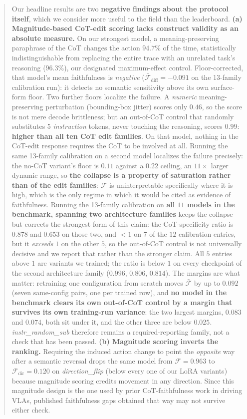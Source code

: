 \documentclass{article}
\begin{document}
\begin{abstract}
Our headline results are two \textbf{negative findings about the protocol itself}, which we consider more useful to the field than the leaderboard. \textbf{(a) Magnitude-based CoT-edit scoring lacks construct validity as an absolute measure.} On our strongest model, a meaning-preserving paraphrase of the CoT changes the action $94.7\%$ of the time, statistically indistinguishable from replacing the entire trace with an unrelated task's reasoning ($96.3\%$), our designated maximum-effect control. Floor-corrected, that model's mean faithfulness is \emph{negative} ($\bar{\mathcal{F}}_{\text{diff}} = -0.091$ on the 13-family calibration run): it detects no semantic sensitivity above its own surface-form floor. Two further floors localize the failure. A \emph{numeric} meaning-preserving perturbation (bounding-box jitter) scores only $0.46$, so the score is not mere decode brittleness; but an out-of-CoT control that randomly substitutes 5 \emph{instruction} tokens, never touching the reasoning, scores $0.99$: \textbf{higher than all ten CoT edit families}. On that model, nothing in the CoT-edit response requires the CoT to be involved at all. Running the same 13-family calibration on a second model localizes the failure precisely: the no-CoT variant's floor is $0.11$ against a $0.22$ ceiling, an $11\times$ larger dynamic range, so \textbf{the collapse is a property of saturation rather than of the edit families}: $\mathcal{F}$ is uninterpretable specifically where it is high, which is the only regime in which it would be cited as evidence of faithfulness. Running the 13-family calibration on \textbf{all $11$ models in the benchmark, spanning two architecture families} keeps the collapse but corrects the strongest form of this claim: the CoT-specificity ratio is $0.878$ and $0.653$ on those two, and $<1$ on $7$ of the $12$ calibration entries, but it \emph{exceeds} $1$ on the other $5$, so the out-of-CoT control is not universally decisive and we report that rather than the stronger claim. All $5$ entries above $1$ are variants we trained; the ratio is below $1$ on every checkpoint of the second architecture family ($0.996$, $0.806$, $0.814$). The margins are what matter: retraining one configuration from scratch moves $\bar{\mathcal{F}}$ by up to $0.092$ (seven same-config pairs, one per trained row), and \textbf{no model in the benchmark clears its own out-of-CoT control by a margin that survives its own training-run variance}: the two largest margins, $0.083$ and $0.074$, both sit under it, and the other three are below $0.025$. \emph{instr\_random\_sub} therefore remains a required-reporting family, not a check that has been passed. \textbf{(b) Magnitude scoring inverts the ranking.} Requiring the induced action change to point the \emph{opposite} way after a semantic reversal drops the same model from $\mathcal{F}\!=\!0.963$ to $\mathcal{F}_{\text{dir}}\!=\!0.120$ on \emph{direction\_flip} (below every one of our LoRA variants) because magnitude scoring credits movement in any direction. Since this magnitude design is the one used by prior CoT-faithfulness work in driving VLAs, published faithfulness gaps obtained that way may not survive either check.


\end{abstract}
\end{document}
